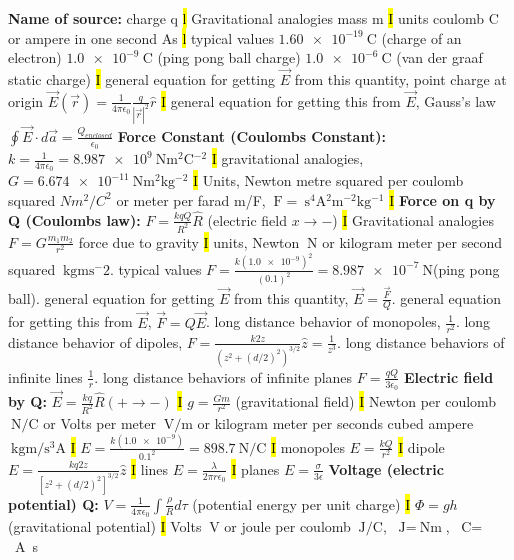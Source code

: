 \documentclass[fontsize=4pt]{scrartcl}
\begin{document}
\textbf{Name of source:} charge q
\hl{l}
Gravitational analogies mass m
\hl{I}
units coulomb C or ampere in one second As
\hl{l}
typical values $\SI{1.60 e-19}{\coulomb}$ (charge of an electron) $\SI{1.0 e-9}{\coulomb}$ (ping pong ball charge) $\SI{1.0 e-6}{\coulomb}$ (van der graaf static charge) 
\hl{I}
general equation for getting $\vec{E}$ from this quantity, point charge at origin $\vec{E}(\vec{r}) = \frac{1}{4\pi \epsilon_0}\frac{q}{|\vec{r}|^2} \hat{r}$
\hl{I}
general equation for getting this from $\vec{E}$, Gauss's law $\oint \vec{E} \cdot d\vec{a} = \frac{Q_{enclosed}}{\epsilon_0}$
\textbf{Force Constant (Coulombs Constant):} $k = \frac{1}{4\pi \epsilon_0} = \SI{8.987e9}{\newton \metre^2  \coulomb^{-2}}$
\hl{I}
gravitational analogies, $G = \SI{6.674e-11}{\newton \metre^2  \kilogram^{-2}}$
\hl{I}
Units, Newton metre squared per coulomb squared $Nm^2/C^2$ or meter per farad m/F, $\SI{}{\farad} = \SI{}{\second^4\ampere^2\meter^{-2}\kilogram^{-1}}$
\hl{I}
\textbf{Force on q by Q (Coulombs law):} $F = \frac{k q Q}{R^2} \hat{R}$ (electric field $x \rightarrow -$)
\hl{I}
Gravitational analogies $F = G \frac{m_1 m_2}{r^2}$ force due to gravity
\hl{I}
units, Newton $\SI{}{\newton}$ or kilogram meter per second squared $\SI{}{\kilogram \meter \second^-2}$. typical values $F =\frac{k(\SI{1.0e-9})^2 }{(0.1)^2} = \SI{8.987e-7}{\newton}$(ping pong ball). general equation for getting $\vec{E}$ from this quantity, $\vec{E} = \frac{\vec{F}}{Q}$. general equation for getting this from $\vec{E}$, $\vec{F} = Q\vec{E}$. long distance behavior of monopoles, $\frac{1}{r^2}$. long distance behavior of dipoles, $F=\frac{k2z}{(z^2 + (d/2)^2)^{3/2}}\hat{z} = \frac{1}{z^3}$. long distance behaviors of infinite lines $\frac{1}{r}$. long distance behaviors of infinite planes $F = \frac{qQ}{3\epsilon_0}$
\textbf{Electric field by Q:}
$\vec{E} = \frac{kq}{R^2}\hat{R}(+ \rightarrow -)$
\hl{I} 
$g = \frac{Gm}{r^2}$ (gravitational field)
\hl{I}
Newton per coulomb $\SI{}{\newton /  \coulomb}$ or Volts per meter $\SI{}{\volt /  \meter}$ or kilogram meter per seconds cubed ampere $\SI{}{\kilogram \meter / \second^3 \ampere}$
\hl{I}
$E = \frac{k(\SI{1.0e-9})}{0.1^2} = 898.7 \SI{}{\newton /  \coulomb}$
\hl{I}
monopoles $E=\frac{kQ}{r^2}$
\hl{I}
dipole $E=\frac{kq2z}{ [z^2 + (d/2)^2]^{3/2} } \hat{z}$
\hl{I}
lines $E= \frac{\lambda}{2\pi r \epsilon_0}$
\hl{I}
planes $E = \frac{\sigma}{3 \epsilon}$
\textbf{Voltage (electric potential) Q:}
$V = \frac{1}{4\pi \epsilon_0} \int \frac{\rho}{R} d\tau$ (potential energy per unit charge)
\hl{I}
$\Phi = gh$ (gravitational potential)
\hl{I}
Volts $\SI{}{\volt}$  or joule per coulomb $\SI{}{\joule / \coulomb}$, $\SI{}{\joule} = \SI{}{\newton \meter}$, $\SI{}{\coulomb} = $\SI{}{\ampere \second}$ $    
\end{document}
